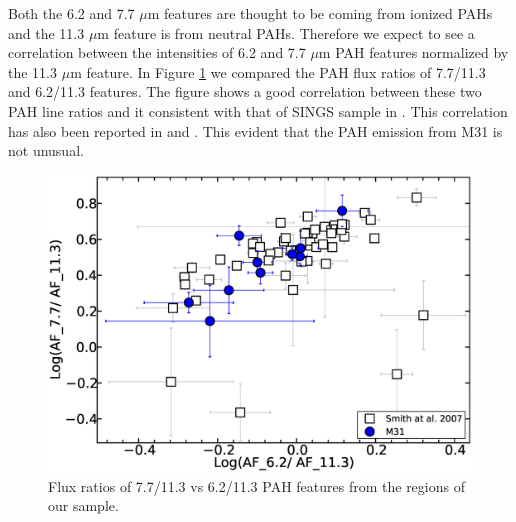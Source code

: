\documentclass[useAMS,usenatbib,a4paper]{mn2e}
\begin{document}
Both the 6.2 and 7.7 $\mu$m features are thought to be coming from ionized PAHs and the 11.3 $\mu$m feature is from neutral PAHs. Therefore we expect to see a correlation between the intensities of 6.2 and 7.7 $\mu$m PAH features normalized by the 11.3 $\mu$m feature. In Figure \ref{PAHlines} we compared the PAH flux ratios of 7.7/11.3  and 6.2/11.3 features. The figure shows a good correlation between these two PAH line ratios and it consistent with that of SINGS sample in \citet{Smith:2007lr}. This correlation has also been reported in \citet{Galliano2008} and \citet{Vermeij2002}. This evident that the PAH emission from M31 is not unusual. 

\begin{figure}
\centering
\includegraphics[scale = 0.25]{./SINGSnMy.eps}
\caption{ Flux ratios of 7.7/11.3 vs 6.2/11.3 PAH features from the regions of our sample.}
\label{PAHlines}
\end{figure}
\end{document}
